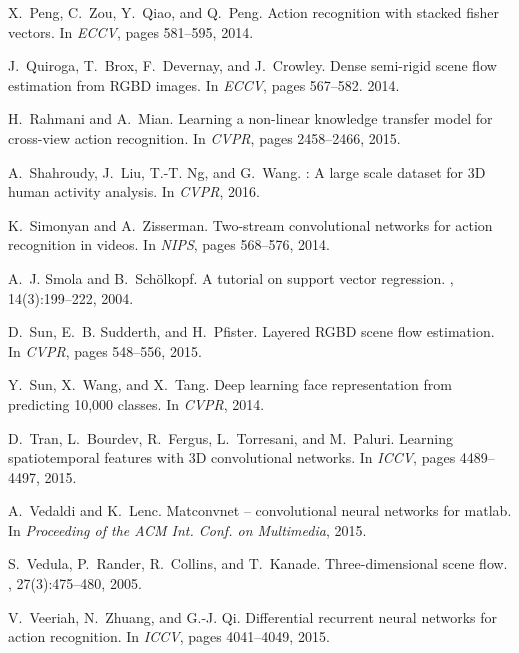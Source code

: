 \documentclass[10pt,twocolumn,letterpaper]{article}
\begin{document}
\begin{thebibliography}{10}
X.~Peng, C.~Zou, Y.~Qiao, and Q.~Peng.
\newblock Action recognition with stacked fisher vectors.
\newblock In {\em ECCV}, pages 581--595, 2014.

J.~Quiroga, T.~Brox, F.~Devernay, and J.~Crowley.
\newblock Dense semi-rigid scene flow estimation from {RGBD} images.
\newblock In {\em ECCV}, pages 567--582. 2014.

H.~Rahmani and A.~Mian.
\newblock Learning a non-linear knowledge transfer model for cross-view action
  recognition.
\newblock In {\em CVPR}, pages 2458--2466, 2015.

A.~Shahroudy, J.~Liu, T.-T. Ng, and G.~Wang.
: A large scale dataset for {3D} human activity analysis.
\newblock In {\em CVPR}, 2016.

K.~Simonyan and A.~Zisserman.
\newblock Two-stream convolutional networks for action recognition in videos.
\newblock In {\em NIPS}, pages 568--576, 2014.

A.~J. Smola and B.~Sch{\"o}lkopf.
\newblock A tutorial on support vector regression.
, 14(3):199--222, 2004.

D.~Sun, E.~B. Sudderth, and H.~Pfister.
\newblock Layered {RGBD} scene flow estimation.
\newblock In {\em CVPR}, pages 548--556, 2015.

Y.~Sun, X.~Wang, and X.~Tang.
\newblock Deep learning face representation from predicting 10,000 classes.
\newblock In {\em CVPR}, 2014.

D.~Tran, L.~Bourdev, R.~Fergus, L.~Torresani, and M.~Paluri.
\newblock Learning spatiotemporal features with {3D} convolutional networks.
\newblock In {\em ICCV}, pages 4489--4497, 2015.

A.~Vedaldi and K.~Lenc.
\newblock Matconvnet -- convolutional neural networks for matlab.
\newblock In {\em Proceeding of the {ACM} Int. Conf. on Multimedia}, 2015.

S.~Vedula, P.~Rander, R.~Collins, and T.~Kanade.
\newblock Three-dimensional scene flow.
, 27(3):475--480, 2005.

V.~Veeriah, N.~Zhuang, and G.-J. Qi.
\newblock Differential recurrent neural networks for action recognition.
\newblock In {\em ICCV}, pages 4041--4049, 2015.


\end{thebibliography}
\end{document}
